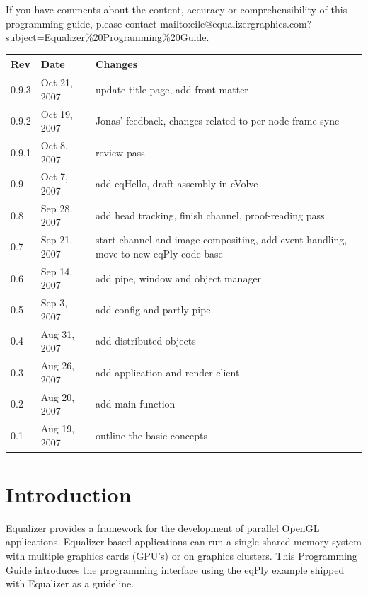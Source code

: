 \documentclass[10pt,a4]{scrartcl}
\begin{document}
If you have comments about the content, accuracy or comprehensibility of
this programming guide, please contact
{mailto:eile@equalizergraphics.com?subject=Equalizer\%20Programming\%20Guide}.


\clearpage
\thispagestyle{empty}
\tableofcontents
\vfill{\center\begin{tabularx}{\textwidth}{|l|l|X|}
    \hline
    \bf Rev & \bf Date     & \bf Changes \\
    \hline
    0.9.3   & Oct 21, 2007 & update title page, add front matter\\
    0.9.2   & Oct 19, 2007 & Jonas' feedback, changes related to
                             per-node frame sync\\
    0.9.1   & Oct 8,  2007 & review pass\\
    0.9     & Oct 7,  2007 & add eqHello, draft assembly in eVolve\\
    0.8     & Sep 28, 2007 & add head tracking, finish channel,
                             proof-reading pass\\
    0.7     & Sep 21, 2007 & start channel and image compositing,
                             add event handling, move to new eqPly
                             code base\\
    0.6     & Sep 14, 2007 & add pipe, window and object manager\\
    0.5     & Sep 3,  2007 & add config and partly pipe\\
    0.4     & Aug 31, 2007 & add distributed objects\\
    0.3     & Aug 26, 2007 & add application and render client\\
    0.2     & Aug 20, 2007 & add main function\\
    0.1     & Aug 19, 2007 & outline the basic concepts\\
    \hline
  \end{tabularx}}
\thispagestyle{empty}
\clearpage


\section{Introduction}

Equalizer provides a framework for the development of parallel OpenGL
applications. Equalizer-based applications can run a single
shared-memory system with multiple graphics cards (GPU's) or on graphics
clusters. This Programming Guide introduces the programming interface
using the \textsf{eqPly} example shipped with Equalizer as a guideline.
\end{document}
